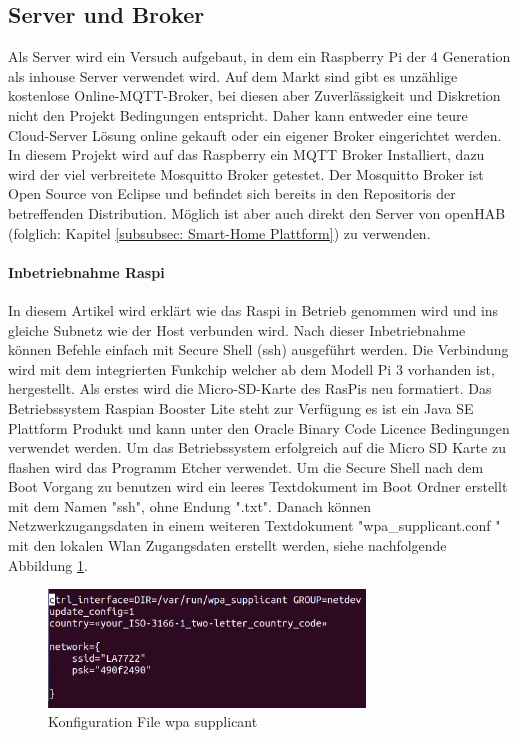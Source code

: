 \subsection{Server und Broker}\label{subsec: Server} 
Als Server wird ein Versuch aufgebaut, in dem ein Raspberry Pi  der 4 Generation als inhouse Server verwendet wird. Auf dem Markt sind gibt es unzählige kostenlose Online-MQTT-Broker, bei diesen aber Zuverlässigkeit und Diskretion nicht den Projekt Bedingungen entspricht. Daher kann entweder eine teure Cloud-Server Lösung online gekauft oder ein eigener Broker eingerichtet werden. In diesem Projekt wird auf das Raspberry ein MQTT Broker Installiert, dazu wird der viel verbreitete Mosquitto Broker getestet. Der Mosquitto Broker ist Open Source von Eclipse und befindet sich bereits in den Repositoris der betreffenden Distribution. Möglich ist aber auch direkt den Server von openHAB (folglich: Kapitel \ref{subsubsec: Smart-Home Plattform}) zu verwenden.
\paragraph{Inbetriebnahme Raspi}
In diesem Artikel wird erklärt wie das Raspi in Betrieb genommen wird und ins gleiche Subnetz wie der Host verbunden wird. Nach dieser Inbetriebnahme können Befehle einfach mit Secure Shell (ssh) ausgeführt werden. Die Verbindung wird mit dem integrierten Funkchip welcher ab dem Modell Pi 3 vorhanden ist, hergestellt.
Als erstes wird die Micro-SD-Karte des RasPis neu formatiert. Das Betriebssystem Raspian Booster Lite steht \cite{noauthor_download_nodate} zur Verfügung es ist ein Java SE Plattform Produkt und kann unter den Oracle Binary Code Licence Bedingungen verwendet werden. Um das Betriebssystem erfolgreich auf die Micro SD Karte zu flashen wird das Programm Etcher \cite{noauthor_balenaetcher_nodate} verwendet. Um die Secure Shell nach dem Boot Vorgang zu benutzen wird ein leeres Textdokument im Boot Ordner erstellt mit dem Namen "ssh", ohne Endung ".txt". Danach können Netzwerkzugangsdaten in einem weiteren Textdokument "wpa\_supplicant.conf " mit den lokalen Wlan Zugangsdaten erstellt werden, siehe nachfolgende Abbildung \ref{pic: wpasupplicant}. 

\begin{figure}[H]
	\centering
	\includegraphics[width=0.75\textwidth]{graphics/WPAsupplicant.png}
	\caption{Konfiguration File wpa supplicant}
	\label{pic: wpasupplicant}
\end{figure}

